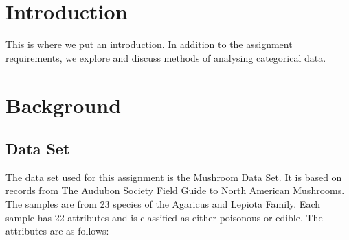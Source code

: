 \documentclass[12pt]{book}
\begin{document}

\tableofcontents
\pagebreak

\chapter{Introduction}
This is where we put an introduction.
In addition to the assignment requirements, we explore and discuss methods of analysing categorical data.

\chapter{Background}
\section{Data Set}
The data set used for this assignment is the Mushroom Data Set.\cite{dataset}
It is based on records from The Audubon Society Field Guide to North American Mushrooms.
The samples are from 23 species of the Agaricus and Lepiota Family.
Each sample has 22 attributes and is classified as either poisonous or edible.
The attributes are as follows:
\end{document}
